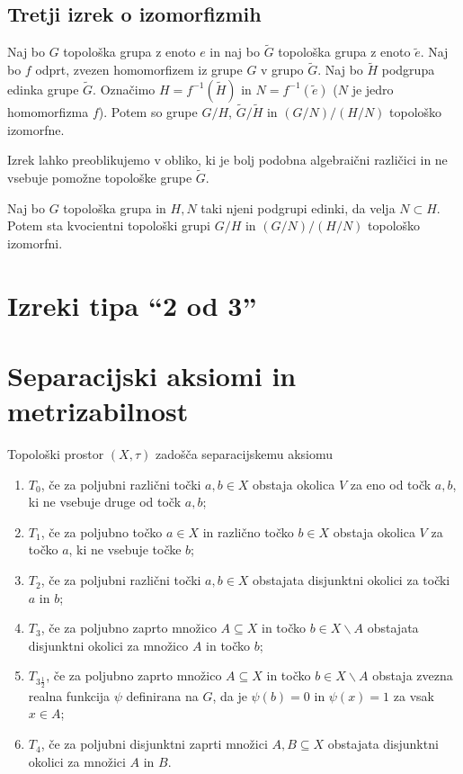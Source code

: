 \documentclass[mat1]{fmfdelo}
\begin{document}
\subsection{Tretji izrek o izomorfizmih}
\begin{izrek}\label{izr:predtretji}
Naj bo $G$ topološka grupa z enoto $e$ in naj bo $\widetilde{G}$ topološka grupa z enoto $\tilde{e}$. Naj bo $f$ odprt, zvezen homomorfizem iz grupe $G$ v grupo $\widetilde{G}$. Naj bo $\widetilde{H}$ podgrupa edinka grupe $\widetilde{G}$. Označimo $H = f^{-1}(\widetilde{H})$ in $N = f^{-1}(\tilde{e})$ ($N$ je jedro homomorfizma $f$). Potem so grupe $G/H$, $\widetilde{G}/\widetilde{H}$ in $(G/N)/(H/N)$ topološko izomorfne.
\end{izrek}

Izrek lahko preoblikujemo v obliko, ki je bolj podobna algebraični različici in ne vsebuje pomožne topološke grupe $\widetilde{G}$.
\begin{izrek}\label{izr:tretjitopizrek}
Naj bo $G$ topološka grupa in $H,N$ taki njeni podgrupi edinki, da velja $N \subset H$. Potem sta kvocientni topološki grupi $G/H$ in $(G/N)/(H/N)$ topološko izomorfni.
\end{izrek}

\section{Izreki tipa ``2 od 3''}

\section{Separacijski aksiomi in metrizabilnost}

\begin{definicija}\label{def:sepaks}
	Topološki prostor $(X, \tau)$ zadošča separacijskemu aksiomu
	\begin{enumerate}
		\item $T_0$, če za poljubni različni točki $a, b \in X$ obstaja okolica $V$ za eno od točk $a, b$, ki ne vsebuje druge od točk $a, b$;
		\item $T_1$, če za poljubno točko $a \in X$ in različno točko $b \in X$ obstaja okolica $V$ za točko $a$, ki ne vsebuje točke $b$;
		\item $T_2$, če za poljubni različni točki $a, b \in X$ obstajata disjunktni okolici za točki $a$ in $b$;
		\item $T_3$, če za poljubno zaprto množico $A \subseteq X$ in točko $b \in X\backslash A$ obstajata disjunktni okolici za množico $A$ in točko $b$;
		\item $T_{3 \frac{1}{2}}$, če za poljubno zaprto množico $A \subseteq X$ in točko $b \in X\backslash A$ obstaja zvezna realna funkcija $\psi$ definirana na $G$, da je $\psi (b) = 0$ in $\psi (x) = 1$ za vsak $x \in A$;
		\item $T_4$, če za poljubni disjunktni zaprti množici $A, B \subseteq X$ obstajata disjunktni okolici za množici $A$ in $B$.
	\end{enumerate}
\end{definicija}
\end{document}
